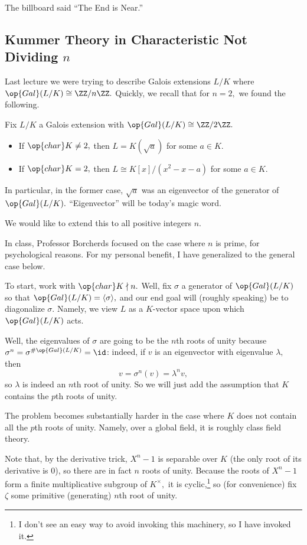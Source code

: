 













The billboard said ``The End is Near.''

\subsection{Kummer Theory in Characteristic Not Dividing \texorpdfstring{$n$}{n}}
Last lecture we were trying to describe Galois extensions $L/K$ where $\op{Gal}(L/K)\cong\ZZ/n\ZZ.$ Quickly, we recall that for $n=2,$ we found the following.
\begin{proposition}
	Fix $L/K$ a Galois extension with $\op{Gal}(L/K)\cong\ZZ/2\ZZ.$
	\begin{itemize}
		\item If $\op{char}K\ne2,$ then $L=K(\sqrt a)$ for some $a\in K.$
		\item If $\op{char}K=2,$ then $L\cong K[x]/\left(x^2-x-a\right)$ for some $a\in K.$
	\end{itemize}
\end{proposition}
\begin{remark}
	In particular, in the former case, $\sqrt a$ was an eigenvector of the generator of $\op{Gal}(L/K).$ ``Eigenvector'' will be today's magic word.
\end{remark}
We would like to extend this to all positive integers $n.$
\begin{warn}
	In class, Professor Borcherds focused on the case where $n$ is prime, for psychological reasons. For my personal benefit, I have generalized to the general case below.
\end{warn}
To start, work with $\op{char}K\nmid n.$ Well, fix $\sigma$ a generator of $\op{Gal}(L/K)$ so that $\op{Gal}(L/K)=\langle\sigma\rangle,$ and our end goal will (roughly speaking) be to diagonalize $\sigma.$ Namely, we view $L$ as a $K$-vector space upon which $\op{Gal}(L/K)$ acts.

Well, the eigenvalues of $\sigma$ are going to be the $n$th roots of unity because $\sigma^n=\sigma^{\#\op{Gal}(L/K)}=\id$: indeed, if $v$ is an eigenvector with eigenvalue $\lambda,$ then
\[v=\sigma^n(v)=\lambda^nv,\]
so $\lambda$ is indeed an $n$th root of unity. So we will just add the assumption that $K$ contains the $p$th roots of unity.
\begin{warn}
	The problem becomes substantially harder in the case where $K$ does not contain all the $p$th roots of unity. Namely, over a global field, it is roughly class field theory.
\end{warn}
Note that, by the derivative trick, $X^n-1$ is separable over $K$ (the only root of its derivative is $0$), so there are in fact $n$ roots of unity. Because the roots of $X^n-1$ form a finite multiplicative subgroup of $K^\times,$ it is cyclic,\footnote{I don't see an easy way to avoid invoking this machinery, so I have invoked it.} so (for convenience) fix $\zeta$ some primitive (generating) $n$th root of unity.

